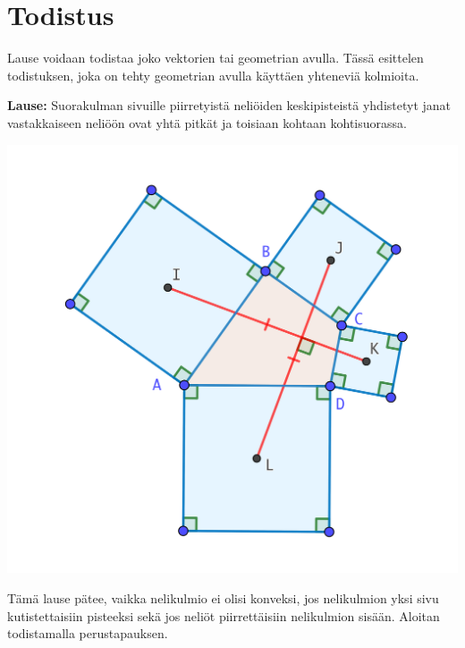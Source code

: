 \documentclass{scrartcl}
\begin{document}
\pagebreak
\section{Todistus}
Lause voidaan todistaa joko vektorien tai geometrian avulla. Tässä esittelen todistuksen, joka on tehty geometrian avulla käyttäen yhteneviä kolmioita.

\medskip
\textbf{Lause:} Suorakulman sivuille piirretyistä neliöiden keskipisteistä yhdistetyt janat vastakkaiseen neliöön ovat yhtä pitkät ja toisiaan kohtaan kohtisuorassa. 
\begin{center}
    \includegraphics[scale=0.3]{todistuskuva}
\end{center}

Tämä lause pätee, vaikka nelikulmio ei olisi konveksi, jos nelikulmion yksi sivu kutistettaisiin pisteeksi sekä jos neliöt piirrettäisiin nelikulmion sisään. Aloitan todistamalla perustapauksen.
\end{document}
